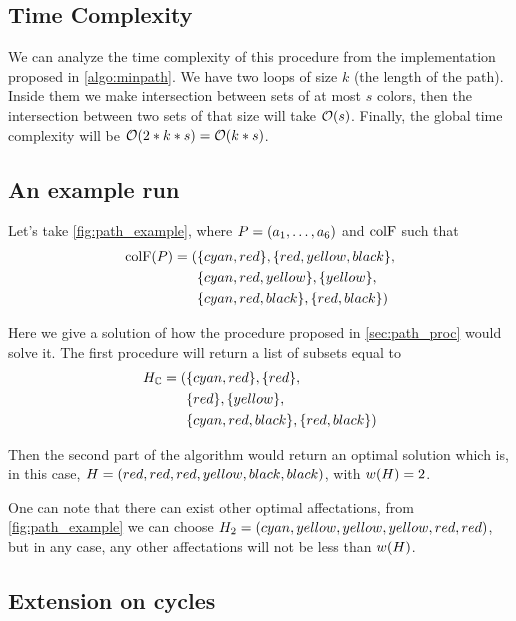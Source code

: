 \subsection{Time Complexity}

We can analyze the time complexity of this procedure from the implementation proposed in \cref{algo:minpath}. We have two loops of size $k$ (the length of the path). Inside them we make intersection between sets of at most $s$ colors, then the intersection between two sets of that size will take $\mathcal{O}(s)$. Finally, the global time complexity will be $\mathcal{O}(2 * k * s) = \mathcal{O}(k*s)$.

\subsection{An example run}
\label{sec:path_ex_run}



Let's take \cref{fig:path_example}, where $P = (a_1,\ldots,a_{6})$ and $\text{colF}$ such that
\begin{align*}
  \text{colF}(P) = ( & \{cyan,red\}, \{red,yellow,black\},    \\
                   & \{cyan,red,yellow\}, \{yellow\},    \\
                   & \{cyan,red,black\}, \{red,black\}   )
\end{align*}

Here we give a solution of how the procedure proposed in \cref{sec:path_proc} would solve it. The first procedure will return a list of subsets equal to
\begin{align*}
  H_{\mathbb{C}} = ( & \{cyan,red\}, \{red\},      \\
                 & \{red\}, \{yellow\},        \\
                 & \{cyan,red,black\}, \{red,black\}   )
\end{align*}

Then the second part of the algorithm would return an optimal solution which is, in this case, $H = (red, red, red, yellow, black, black)$, with $w(H) = 2$.

One can note that there can exist other optimal affectations, from \cref{fig:path_example} we can choose $H_2 = (cyan, yellow, yellow, yellow, red, red)$, but in any case, any other affectations will not be less than  $w(H)$.

\subsection{Extension on cycles}

